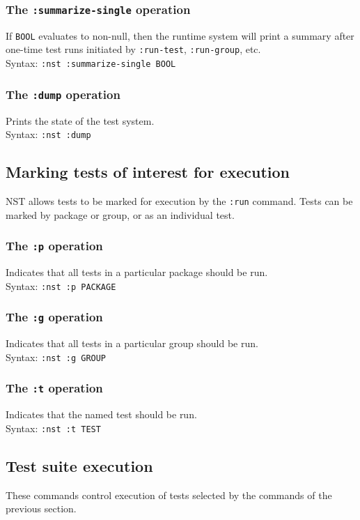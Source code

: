 \subsubsection{The \texttt{:summarize-single} operation}
%
If \texttt{BOOL} evaluates to non-null, then the runtime system will
print a summary after one-time test runs initiated by
\texttt{:run-test}, \texttt{:run-group}, etc.
\\ Syntax: \texttt{:nst :summarize-single BOOL}

\subsubsection{The \texttt{:dump} operation}
%
Prints the state of the test system.
\\ Syntax: \texttt{:nst :dump}

\subsection{Marking tests of interest for execution}
\label{nominating-tests}
NST allows tests to be marked for execution by the \texttt{:run}
command.  Tests can be marked by package or group, or as an individual
test.

\subsubsection{The \texttt{:p} operation}
%
Indicates that all tests in a particular package should be run.
\\ Syntax: \texttt{:nst :p PACKAGE}

\subsubsection{The \texttt{:g} operation}
%
Indicates that all tests in a particular group should be run.
\\ Syntax: \texttt{:nst :g GROUP}

\subsubsection{The \texttt{:t} operation}
%
Indicates that the named test should be run.
\\ Syntax: \texttt{:nst :t TEST}

\subsection{Test suite execution}
These commands control execution of tests selected by the commands of
the previous section.

